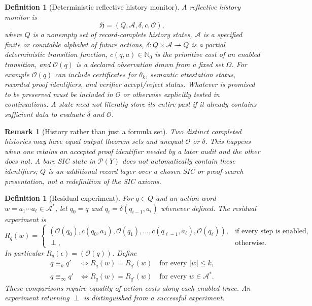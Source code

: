 \documentclass[11pt,letterpaper]{article}
\newtheorem{definition}[theorem]{Definition}
\newtheorem{remark}[theorem]{Remark}
\newcommand{\Ob}{\mathcal{O}}
\newcommand{\ACT}{\mathcal{A}}
\newcommand{\Nzero}{\mathbb N_0}
\newcommand{\botx}{\perp}
\newcommand{\Rinf}{\equiv_{\!\infty}}
\newcommand{\Rk}[1]{\equiv_{\!#1}}
\begin{document}
\begin{definition}[Deterministic reflective history monitor]\label{def:monitor}
A \emph{reflective history monitor} is
\[
\mathfrak H=(Q,\ACT,\delta,c,\Ob),
\]
where $Q$ is a \emph{nonempty} set of record-complete history states, $\ACT$ is a specified finite or countable alphabet of future actions, $\delta:Q\times\ACT\rightharpoonup Q$ is a partial deterministic transition function, $c(q,a)\in\Nzero$ is the primitive cost of an enabled transition, and $\Ob(q)$ is a declared observation drawn from a fixed set $\Omega$. For example $\Ob(q)$ can include certificates for $\theta_k$, semantic attestation status, recorded proof identifiers, and verifier accept/reject status. Whatever is promised to be preserved \emph{must be included} in $\Ob$ or otherwise explicitly tested in continuations. A state need not literally store its entire past if it already contains sufficient data to evaluate $\delta$ and $\Ob$.
\end{definition}
\begin{remark}[History rather than just a formula set]
Two distinct completed histories may have equal output theorem sets and unequal $\Ob$ or $\delta$. This happens when one retains an accepted proof identifier needed by a later audit and the other does not. A bare SIC state in $\mathcal P(Y)$ does not automatically contain these identifiers; $Q$ is an \emph{additional record layer} over a chosen SIC or proof-search presentation, not a redefinition of the SIC axioms.
\end{remark}
\begin{definition}[Residual experiment]\label{def:residual}
For $q\in Q$ and an action word $w=a_1\cdots a_\ell\in\ACT^*$, let $q_0=q$ and $q_i=\delta(q_{i-1},a_i)$ whenever defined. The \emph{residual experiment} is
\[
 R_q(w)=\begin{cases}
 (\Ob(q_0),c(q_0,a_1),\Ob(q_1),\ldots,c(q_{\ell-1},a_\ell),\Ob(q_\ell)),&\text{if every step is enabled},\\
 \botx,&\text{otherwise}.
 \end{cases}
\]
In particular $R_q(\epsilon)=(\Ob(q))$. Define
\[
\begin{aligned}
 q\Rk{k}q' &\iff R_q(w)=R_{q'}(w)\quad\text{for every }|w|\le k,\\
 q\Rinf q' &\iff R_q(w)=R_{q'}(w)\quad\text{for every }w\in\ACT^*.
\end{aligned}
\]
These comparisons require equality of action costs \emph{along each enabled trace}. An experiment returning $\botx$ is distinguished from a successful experiment.
\end{definition}
\end{document}
